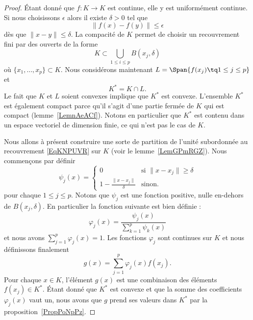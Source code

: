 \begin{proof}
    Étant donné que \( f\colon K\to K\) est continue, elle y est uniformément continue. Si nous choisissons \( \epsilon\) alors il existe \( \delta>0\) tel que
    \begin{equation}
        \| f(x)-f(y) \|\leq \epsilon
    \end{equation}
    dès que \( \| x-y \|\leq \delta\). La compacité de \( K\) permet de choisir un recouvrement fini par des ouverts de la forme
    \begin{equation}    \label{EqKNPUVR}
        K\subset \bigcup_{1\leq i\leq p}B(x_j,\delta)
    \end{equation}
    où \( \{ x_1,\ldots, x_p \}\subset K\). Nous considérons maintenant \( L=\Span\{ f(x_j)\tq 1\leq j\leq p \}\) et
    \begin{equation}
        K^*=K\cap L.
    \end{equation}
    Le fait que \( K\) et \( L\) soient convexes implique que \( K^*\) est convexe. L'ensemble \( K^*\) est également compact parce qu'il s'agit d'une partie fermée de \( K\) qui est compact (lemme~\ref{LemnAeACf}). Notons en particulier que \( K^*\) est contenu dans un espace vectoriel de dimension finie, ce qui n'est pas le cas de \( K\).

    Nous allons à présent construire une sorte de partition de l'unité subordonnée au recouvrement \eqref{EqKNPUVR} sur \( K\) (voir le lemme~\ref{LemGPmRGZ}). Nous commençons par définir
    \begin{equation}
        \psi_j(x)=\begin{cases}
            0    &   \text{si } \| x-x_j \|\geq \delta\\
            1-\frac{ \| x-x_j \| }{ \delta }    &    \text{sinon}.
        \end{cases}
    \end{equation}
    pour chaque \( 1\leq j\leq p\). Notons que \( \psi_j\) est une fonction positive, nulle en-dehors de \( B(x_j,\delta)\). En particulier la fonction suivante est bien définie :
    \begin{equation}
        \varphi_j(x)=\frac{ \psi_j(x) }{ \sum_{k=1}^p\psi_k(x) }
    \end{equation}
    et nous avons \( \sum_{j=1}^p\varphi_j(x)=1\). Les fonctions \( \varphi_j\) sont continues sur \( K\) et nous définissons finalement
    \begin{equation}
        g(x)=\sum_{j=1}^p\varphi_j(x)f(x_j).
    \end{equation}
    Pour chaque \( x\in K\), l'élément \( g(x)\) est une combinaison des éléments \( f(x_j)\in K^*\). Étant donné que \( K^*\) est convexe et que la somme des coefficients \( \varphi_j(x)\) vaut un, nous avons que \( g\) prend ses valeurs dans \( K^*\) par la proposition~\ref{PropPoNpPz}.


\end{proof}
